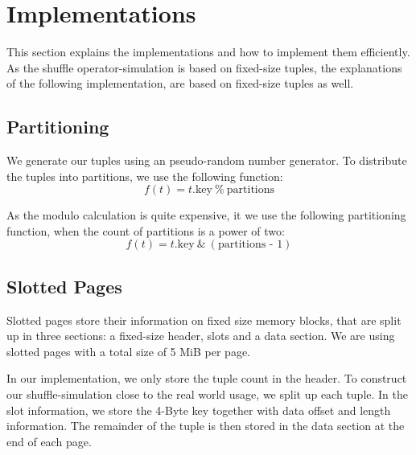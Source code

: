 
\chapter{Implementations}\label{chapter:implementations}
This section explains the implementations and how to implement them efficiently.
As the shuffle operator-simulation is based on fixed-size tuples, the explanations of the following implementation, are based on fixed-size tuples as well.

\section{Partitioning}
We generate our tuples using an pseudo-random number generator.
To distribute the tuples into partitions, we use the following function:
\begin{equation}
  f(t) = t\textrm{.key}\ \%\ \textrm{partitions}
\end{equation}

As the modulo calculation is quite expensive, it we use the following partitioning function, when the count of partitions is a power of two:
\begin{equation}
  f(t) = t\textrm{.key}\ \&\ (\textrm{partitions - 1})
\end{equation}

\section{Slotted Pages}
Slotted pages store their information on fixed size memory blocks, that are split up in three sections: a fixed-size header, slots and a data section.
We are using slotted pages with a total size of 5 MiB per page.

In our implementation, we only store the tuple count in the header.
To construct our shuffle-simulation close to the real world usage, we split up each tuple.
In the slot information, we store the 4-Byte key together with data offset and length information.
The remainder of the tuple is then stored in the data section at the end of each page.

